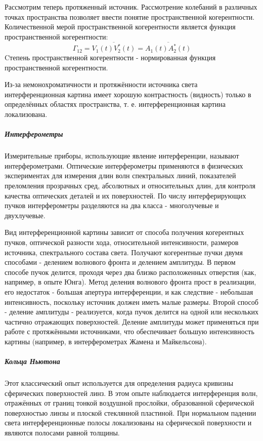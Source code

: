 \documentclass[12pt]{article}
\begin{document}
		Рассмотрим теперь протяженный источник. Рассмотрение колебаний в различных точках пространства позволяет ввести понятие пространственной когерентности. Количественной мерой пространственной когерентности является функция пространственной когерентности:
		\begin{equation}
		\Gamma_{12} = \overline{V_1(t)V_2^*(t)} = \overline{A_1(t)A_2^*(t)}
		\end{equation}
		Cтепень пространственной когерентности - нормированная функция пространственной когерентности.
		
		Из-за немонохроматичности и протяжённости источника света интерференционная картина имеет хорошую контрастность (видность)
		только в определённых областях пространства, т. е. интерференционная картина локализована.
		
		\subparagraph{Интерферометры}
		Измерительные приборы, использующие явление интерференции,
		называют интерферометрами. Оптические интерферометры применяются в физических экспериментах для измерения длин волн спектральных линий, показателей преломления прозрачных сред, абсолютных и относительных длин, для контроля качества оптических деталей и
		их поверхностей. По числу интерферирующих пучков интерферометры разделяются на два класса - многолучевые и двухлучевые.
		
		
		Вид интерференционной картины зависит от способа получения когерентных пучков, оптической разности хода, относительной интенсивности, размеров источника, спектрального состава света. Получают когерентные пучки двумя способами - делением волнового фронта и делением амплитуды.
		В первом способе пучок делится, проходя через два близко расположенных отверстия (как, например, в опыте Юнга). Метод деления волнового фронта прост в реализации, его недостаток - большая апертура интерференции, и как следствие - небольшая интенсивность, поскольку источник должен иметь малые размеры.
		Второй способ - деление амплитуды - реализуется, когда пучок
		делится на одной или нескольких частично отражающих поверхностей.
		Деление амплитуды может применяться при работе с протяжёнными
		источниками, что обеспечивает большую интенсивность картины (например, в интерферометрах Жамена и Майкельсона).
		
		\subparagraph{Кольца Ньютона}
		Этот классический опыт используется для определения радиуса
		кривизны сферических поверхностей линз. В этом опыте наблюдается интерференция волн, отражённых от границ тонкой воздушной прослойки, образованной сферической поверхностью линзы и плоской стеклянной пластиной. При нормальном падении света интерференционные полосы локализованы на сферической поверхности и являются полосами равной толщины.
		
\end{document}
